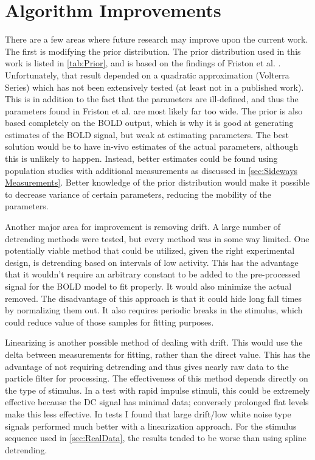 \section{Algorithm Improvements}
\label{sec:Particle Filter Variations}
There are a few areas where future research may improve upon the current
work. The first is modifying the prior
distribution. The prior distribution used in this work is listed in \autoref{tab:Prior},
and is based on the findings of Friston et al. \cite{Friston2000}. Unfortunately, that
result depended on a quadratic approximation (Volterra Series) which has
not been extensively tested (at least not in a published work).
This is in addition to the fact that the parameters are ill-defined, and
thus the parameters found in Friston et al. are most likely far too wide.
The prior is also
based completely on the BOLD output, which is why it is good at generating
estimates of the BOLD signal, but weak at estimating parameters.
The best solution would be to have
in-vivo estimates of the actual parameters, although this
is unlikely to happen. Instead, better estimates could be found
using population studies with additional measurements as discussed in
\autoref{sec:Sideways Measurements}. Better knowledge of the prior distribution
would make it possible to decrease variance of certain
parameters, reducing the mobility of the parameters.

Another major area for improvement is removing drift.
A large number of detrending methods were tested, but every method was in some way limited.
One potentially viable method that could be utilized, given the right
experimental design, is detrending based on intervals of low activity. This
has the advantage that it wouldn't require an arbitrary
constant to be added to the pre-processed signal for the
BOLD model to fit properly. It would also minimize the actual
removed. The disadvantage of this approach is
that it could hide long fall times by normalizing them
out. It also requires periodic breaks in the stimulus,
which could reduce value of those samples for fitting purposes.

Linearizing is another possible method of dealing with drift.
This would use the delta between measurements for fitting, rather than the
direct value. This has the advantage of not requiring detrending and thus
gives nearly raw data to the particle filter for processing.
The effectiveness of this method depends directly on the type of stimulus.
In a test with rapid impulse stimuli, this could be extremely effective because
the DC signal has minimal data; conversely prolonged flat levels make this less effective.
In tests I found that large drift/low white noise
type signals performed much better with a linearization approach.
For the stimulus sequence used in \autoref{sec:RealData}, the results tended to be worse
than using spline detrending.


